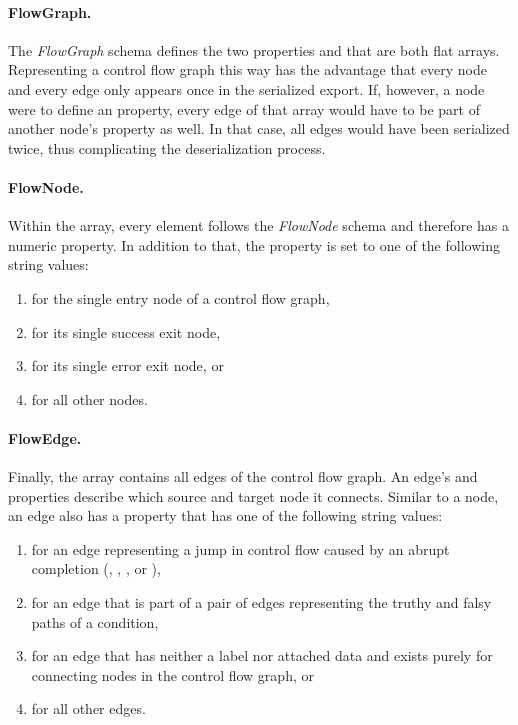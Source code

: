 \paragraph{FlowGraph.}
The \textit{FlowGraph} schema defines the two properties  and  that are both flat arrays. Representing a control flow graph this way has the advantage that every node and every edge only appears once in the serialized export. If, however, a node were to define an  property, every edge of that array would have to be part of another node's  property as well. In that case, all edges would have been serialized twice, thus complicating the deserialization process.

\paragraph{FlowNode.}
Within the  array, every element follows the \textit{FlowNode} schema and therefore has a numeric  property. In addition to that, the  property is set to one of the following string values:

\begin{enumerate}
  \item {} for the single entry node of a control flow graph,
  \item {} for its single success exit node,
  \item {} for its single error exit node, or
  \item {} for all other nodes.
\end{enumerate} 

\paragraph{FlowEdge.}
Finally, the  array contains all edges of the control flow graph. An edge's  and  properties describe which source and target node it connects. Similar to a node, an edge also has a  property that has one of the following string values:

\begin{enumerate}
  \item {} for an edge representing a jump in control flow caused by an abrupt completion (, , , or ),
  \item {} for an edge that is part of a pair of edges representing the truthy and falsy paths of a condition,
  \item {} for an edge that has neither a label nor attached data and exists purely for connecting nodes in the control flow graph, or
  \item {} for all other edges.
\end{enumerate} 

